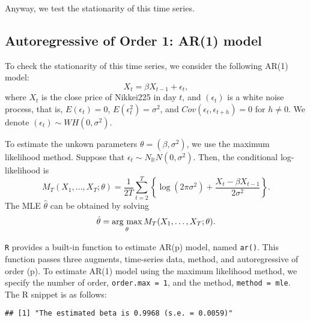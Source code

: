 \documentclass[
  12pt,
]{article}
\newenvironment{Shaded}{\begin{snugshade}}{\end{snugshade}}
\newcommand{\DataTypeTok}[1]{\textcolor[rgb]{0.13,0.29,0.53}{#1}}
\newcommand{\DecValTok}[1]{\textcolor[rgb]{0.00,0.00,0.81}{#1}}
\newcommand{\KeywordTok}[1]{\textcolor[rgb]{0.13,0.29,0.53}{\textbf{#1}}}
\newcommand{\NormalTok}[1]{#1}
\newcommand{\OperatorTok}[1]{\textcolor[rgb]{0.81,0.36,0.00}{\textbf{#1}}}
\newcommand{\StringTok}[1]{\textcolor[rgb]{0.31,0.60,0.02}{#1}}
\begin{document}
Anyway, we test the stationarity of this time series.

\hypertarget{autoregressive-of-order-1-ar1-model}{%
\subsection{Autoregressive of Order 1: AR(1)
model}\label{autoregressive-of-order-1-ar1-model}}

To check the stationarity of this time series, we consider the following
AR(1) model: \[ X_t = \beta X_{t-1} + \epsilon_t, \] where \(X_t\) is
the close price of Nikkei225 in day \(t\), and \((\epsilon_t)\) is a
white noise process, that is, \(E(\epsilon_t) = 0\),
\(E(\epsilon_t^2) = \sigma^2\), and
\(Cov(\epsilon_t, \epsilon_{t+h}) = 0\) for \(h \not= 0\). We denote
\((\epsilon_t) \sim WH(0, \sigma^2)\).

To estimate the unkown parameters \(\theta = (\beta, \sigma^2)\), we use
the maximum likelihood method. Suppose that
\(\epsilon_t \sim N_{\mathbb{R}}N(0, \sigma^2)\). Then, the conditional
log-likelihood is \[
  M_T(X_1, \ldots, X_T; \theta) 
  = \frac{1}{2T} \sum_{t=2}^T \left\{ \log(2\pi\sigma^2) + \frac{X_t - \beta X_{t-1}}{2\sigma^2} \right\}.
\] The MLE \(\hat{\theta}\) can be obtained by solving
\[ \hat{\theta} = \mathop{\rm arg~max}\limits_{\theta} M_T(X_1, \ldots, X_T; \theta). \]

\texttt{R} provides a built-in function to estimate AR(p) model, named
\texttt{ar()}. This function passes three augments, time-series data,
method, and autoregressive of order (p). To estimate AR(1) model using
the maximum likelihood method, we specify the number of order,
\texttt{order.max\ =\ 1}, and the method, \texttt{method\ =\ mle}. The R
snippet is as follows:

\begin{Shaded}
\end{Shaded}

\begin{verbatim}
## [1] "The estimated beta is 0.9968 (s.e. = 0.0059)"
\end{verbatim}
\end{document}
